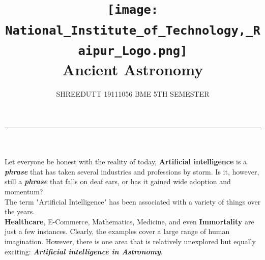 \documentclass[12pt,letterpaper]{article}
\begin{document}
\title{
\texttt{[image: National\_Institute\_of\_Technology,\_Raipur\_Logo.png]}
\\ 
Ancient Astronomy
}

\author{SHREEDUTT 19111056 BME 5TH SEMESTER}

\maketitle
\rule{\textwidth}{0.5pt}
\\
\subsubsection*{}
Let everyone be honest with the reality of today, \textbf{Artificial intelligence} is a \textbf{\textit{phrase}} that has taken several industries and professions by storm. Is it, however, still a \textbf{\textit{phrase}} that falls on deaf ears, or has it gained wide adoption and momentum?
\\
The term "Artificial Intelligence" has been associated with a variety of things over the years.
\\
\textbf{Healthcare}, E-Commerce, Mathematics, Medicine, and even \textbf{Immortality} are just a few instances. Clearly, the examples cover a large range of human imagination. However, there is one area that is relatively unexplored but equally exciting: \textbf{\textit{Artificial intelligence in Astronomy}}.
\\
\end{document}
